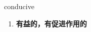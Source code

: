 
\begin{frame}
{\huge conducive}
\begin{center}
\begin{enumerate}\Large
  \item \textbf{有益的，有促进作用的}
\end{enumerate}
\end{center}
\end{frame}
